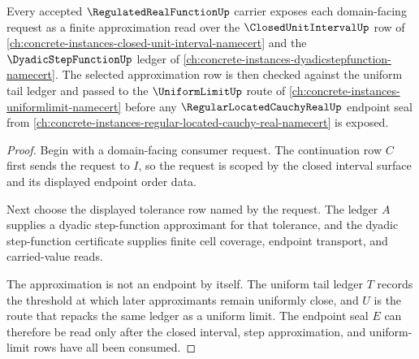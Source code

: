\begin{theorem}
\label{thm:regulated-real-function-step-approximation-coverage}
Every accepted $\RegulatedRealFunctionUp$ carrier exposes each domain-facing request as a finite approximation read over the $\ClosedUnitIntervalUp$ row of \autoref{ch:concrete-instances-closed-unit-interval-namecert} and the $\DyadicStepFunctionUp$ ledger of \autoref{ch:concrete-instances-dyadicstepfunction-namecert}. The selected approximation row is then checked against the uniform tail ledger and passed to the $\UniformLimitUp$ route of \autoref{ch:concrete-instances-uniformlimit-namecert} before any $\RegularLocatedCauchyRealUp$ endpoint seal from \autoref{ch:concrete-instances-regular-located-cauchy-real-namecert} is exposed.
\end{theorem}
\begin{proof}
Begin with a domain-facing consumer request. The continuation row $C$ first sends the request to $I$, so the request is scoped by the closed interval surface and its displayed endpoint order data.

Next choose the displayed tolerance row named by the request. The ledger $A$ supplies a dyadic step-function approximant for that tolerance, and the dyadic step-function certificate supplies finite cell coverage, endpoint transport, and carried-value reads.

The approximation is not an endpoint by itself. The uniform tail ledger $T$ records the threshold at which later approximants remain uniformly close, and $U$ is the route that repacks the same ledger as a uniform limit. The endpoint seal $E$ can therefore be read only after the closed interval, step approximation, and uniform-limit rows have all been consumed.
\end{proof}

